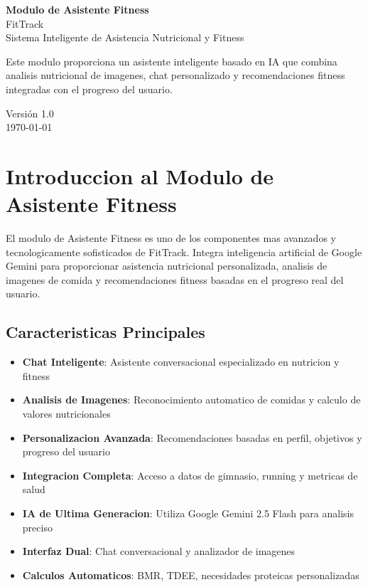 \documentclass[12pt,a4paper]{article}
\begin{document}
\begin{titlepage}
\centering
\vspace*{2cm}

{\Huge\bfseries Modulo de Asistente Fitness}\\[0.5cm]
{\LARGE FitTrack}\\[1cm]

{\large Sistema Inteligente de Asistencia Nutricional y Fitness}\\[2cm]

\begin{minipage}{0.8\textwidth}
\centering
Este modulo proporciona un asistente inteligente basado en IA que combina analisis nutricional de imagenes, chat personalizado y recomendaciones fitness integradas con el progreso del usuario.
\end{minipage}

\vfill

{\large Versión 1.0}\\[0.5cm]
{\large \today}

\end{titlepage}

\tableofcontents
\newpage

\section{Introduccion al Modulo de Asistente Fitness}

El modulo de Asistente Fitness es uno de los componentes mas avanzados y tecnologicamente sofisticados de FitTrack. Integra inteligencia artificial de Google Gemini para proporcionar asistencia nutricional personalizada, analisis de imagenes de comida y recomendaciones fitness basadas en el progreso real del usuario.

\subsection{Caracteristicas Principales}

\begin{itemize}
    \item \textbf{Chat Inteligente}: Asistente conversacional especializado en nutricion y fitness
    \item \textbf{Analisis de Imagenes}: Reconocimiento automatico de comidas y calculo de valores nutricionales
    \item \textbf{Personalizacion Avanzada}: Recomendaciones basadas en perfil, objetivos y progreso del usuario
    \item \textbf{Integracion Completa}: Acceso a datos de gimnasio, running y metricas de salud
    \item \textbf{IA de Ultima Generacion}: Utiliza Google Gemini 2.5 Flash para analisis preciso
    \item \textbf{Interfaz Dual}: Chat conversacional y analizador de imagenes
    \item \textbf{Calculos Automaticos}: BMR, TDEE, necesidades proteicas personalizadas
\end{itemize}
\end{document}
